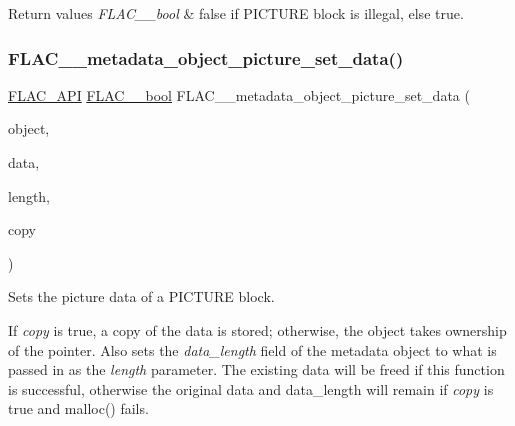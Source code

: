 \begin{DoxyRetVals}{Return values}
{\em F\+L\+A\+C\+\_\+\+\_\+bool} & {\ttfamily false} if P\+I\+C\+T\+U\+RE block is illegal, else {\ttfamily true}. \\
\hline
\end{DoxyRetVals}
\mbox{\label{group__flac__metadata__object_ga07e5950094528e2954c06d7991d543a8}} 
\subsubsection{\texorpdfstring{F\+L\+A\+C\+\_\+\+\_\+metadata\+\_\+object\+\_\+picture\+\_\+set\+\_\+data()}{FLAC\_\_metadata\_object\_picture\_set\_data()}}
{\footnotesize\ttfamily \hyperlink{group__flac__export_ga56ca07df8a23310707732b1c0007d6f5}{F\+L\+A\+C\+\_\+\+A\+PI} \hyperlink{ordinals_8h_a95103469f1cbd78b8cf250194985b34e}{F\+L\+A\+C\+\_\+\+\_\+bool} F\+L\+A\+C\+\_\+\+\_\+metadata\+\_\+object\+\_\+picture\+\_\+set\+\_\+data (\begin{DoxyParamCaption}\item[{\hyperlink{struct_f_l_a_c_____stream_metadata}{F\+L\+A\+C\+\_\+\+\_\+\+Stream\+Metadata} $\ast$}]{object,  }\item[{\hyperlink{ordinals_8h_a5eb569b12d5b047cdacada4d57924ee3}{F\+L\+A\+C\+\_\+\+\_\+byte} $\ast$}]{data,  }\item[{\hyperlink{ordinals_8h_a9c4005ea7ef8d564b0cc993cdd0e4e5e}{F\+L\+A\+C\+\_\+\+\_\+uint32}}]{length,  }\item[{\hyperlink{ordinals_8h_a95103469f1cbd78b8cf250194985b34e}{F\+L\+A\+C\+\_\+\+\_\+bool}}]{copy }\end{DoxyParamCaption})}

Sets the picture data of a P\+I\+C\+T\+U\+RE block.

If {\itshape copy} is {\ttfamily true}, a copy of the data is stored; otherwise, the object takes ownership of the pointer. Also sets the {\itshape data\+\_\+length} field of the metadata object to what is passed in as the {\itshape length} parameter. The existing data will be freed if this function is successful, otherwise the original data and data\+\_\+length will remain if {\itshape copy} is {\ttfamily true} and malloc() fails.

